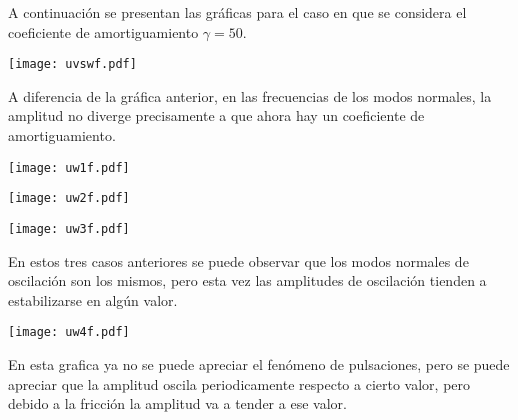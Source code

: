 \documentclass[11pt,letterpaper]{exam}
\begin{document}
A continuación se presentan las gráficas para el caso en que se considera el coeficiente de amortiguamiento $\gamma=50$.
\begin{center}
\texttt{[image: uvswf.pdf]}
\end{center}
A diferencia de la gráfica anterior, en las frecuencias de los modos normales, la amplitud no diverge precisamente a que ahora hay un coeficiente de amortiguamiento.
\begin{center}
\texttt{[image: uw1f.pdf]}
\end{center}

\begin{center}
\texttt{[image: uw2f.pdf]}
\end{center}

\begin{center}
\texttt{[image: uw3f.pdf]}
\end{center}
En estos tres casos anteriores se puede observar que los modos normales de oscilación son los mismos, pero esta vez las amplitudes de oscilación tienden a estabilizarse en algún valor.
\begin{center}
\texttt{[image: uw4f.pdf]}
\end{center}
En esta grafica ya no se puede apreciar el fenómeno de pulsaciones, pero se puede apreciar que la amplitud oscila periodicamente respecto a cierto valor, pero debido a la fricción la amplitud va a tender a ese valor.
\end{document}
